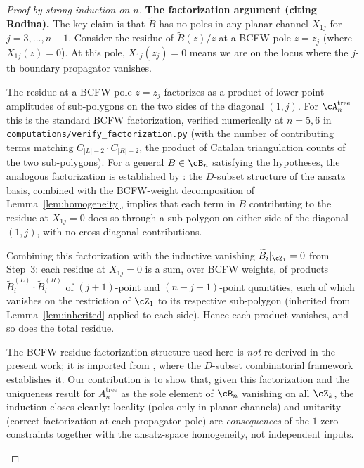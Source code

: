 \begin{proof}[Proof by strong induction on $n$]
\textbf{The factorization argument (citing Rodina).}
The key claim is that $\widetilde{B}$ has no poles in any
planar channel $X_{1j}$ for $j = 3, \ldots, n-1$.
Consider the residue of $\widetilde{B}(z)/z$ at a BCFW
pole $z = z_j$ (where $X_{1j}(z) = 0$).
At this pole, $X_{1j}(z_j) = 0$ means we are on the locus
where the $j$-th boundary propagator vanishes.

The residue at a BCFW pole $z = z_j$ factorizes as a
product of lower-point amplitudes of sub-polygons on the
two sides of the diagonal $(1, j)$. For $\cA_n^{\mathrm{tree}}$
this is the standard BCFW factorization, verified
numerically at $n = 5, 6$ in
\texttt{computations/verify\_factorization.py}
(with the number of contributing terms matching
$C_{|L|-2} \cdot C_{|R|-2}$, the product of Catalan
triangulation counts of the two sub-polygons).
For a general $B \in \cB_n$ satisfying the hypotheses,
the analogous factorization is established by
\cite[Sec.~3, Prop.~3.2--3.4]{Rodina2024}:
the $D$-subset structure of the ansatz basis, combined
with the BCFW-weight decomposition of
Lemma~\ref{lem:homogeneity}, implies that each term in
$B$ contributing to the residue at $X_{1j} = 0$ does so
through a sub-polygon on either side of the diagonal
$(1, j)$, with no cross-diagonal contributions.

Combining this factorization with the inductive vanishing
$\widetilde{B}_i|_{\cZ_1} = 0$ from Step~3:
each residue at $X_{1j} = 0$ is a sum, over BCFW weights,
of products $\widetilde{B}_i^{(L)} \cdot \widetilde{B}_i^{(R)}$
of $(j{+}1)$-point and $(n{-}j{+}1)$-point quantities,
each of which vanishes on the restriction of $\cZ_1$
to its respective sub-polygon (inherited from
Lemma~\ref{lem:inherited} applied to each side).
Hence each product vanishes, and so does the total residue.

\begin{remark}
\label{rmk:rodina-factorization}
The BCFW-residue factorization structure used here is
\emph{not} re-derived in the present work; it is imported
from \cite[Sec.~3]{Rodina2024}, where the $D$-subset
combinatorial framework establishes it.
Our contribution is to show that, given this factorization
and the uniqueness result for $A_n^{\mathrm{tree}}$ as the
sole element of $\cB_n$ vanishing on all $\cZ_k$, the
induction closes cleanly: locality (poles only in planar
channels) and unitarity (correct factorization at each
propagator pole) are \emph{consequences} of the $1$-zero
constraints together with the ansatz-space homogeneity,
not independent inputs.


\end{remark}
\end{proof}
